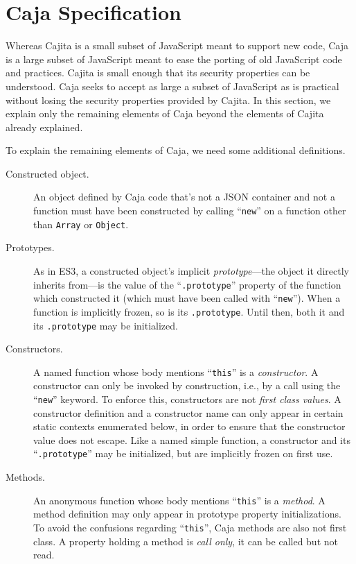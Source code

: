 \documentclass[letterpaper,twocolumn,10pt]{article}
\newcommand{\code}[1]{{\tt {#1}}}              %
\begin{document}
\section{Caja Specification}
\label{sec:caja-spec}

Whereas Cajita is a small subset of JavaScript meant to support new code, 
Caja is a large subset of JavaScript meant to ease the porting of old 
JavaScript code and practices. Cajita is small enough that its security 
properties can be understood. Caja seeks to accept as large a subset of 
JavaScript as is practical without losing the security properties provided by 
Cajita. In this section, we explain only the remaining elements of Caja 
beyond the elements of Cajita already explained.

To explain the remaining elements of Caja, we need some additional 
definitions.

\begin{description}

  \item[Constructed object.] An object defined by Caja code that's not a JSON 
  container and not a function must have been constructed by calling 
  ``\code{new}'' on a function other than \code{Array} or \code{Object}. 

  \item[Prototypes.] As in ES3, a constructed object's implicit 
  \emph{prototype}---the object it directly inherits from---is the value of 
  the ``\code{.prototype}'' property of the function which constructed it 
  (which must have been called with ``\code{new}''). When a function is 
  implicitly frozen, so is its \code{.prototype}. Until then, both it and its 
  \code{.prototype} may be initialized. 

  \item[Constructors.] A named function whose body mentions ``\code{this}'' 
  is a \emph{constructor}. A constructor can only be invoked by construction, 
  i.e., by a call using the ``\code{new}'' keyword. To enforce this, 
  constructors are not \emph{first class values}. A constructor definition 
  and a constructor name can only appear in certain static contexts 
  enumerated below, in order to ensure that the constructor value does not 
  escape. Like a named simple function, a constructor and its 
  ``\code{.prototype}'' may be initialized, but are implicitly frozen on 
  first use. 
    
  \item[Methods.] An anonymous function whose body mentions ``\code{this}'' 
  is a \emph{method}. A method definition may only appear in prototype 
  property initializations. To avoid the confusions regarding 
  ``\code{this}'', Caja methods are also not first class. A property holding 
  a method is \emph{call only}, it can be called but not read.
  
\end{description}
\end{document}
